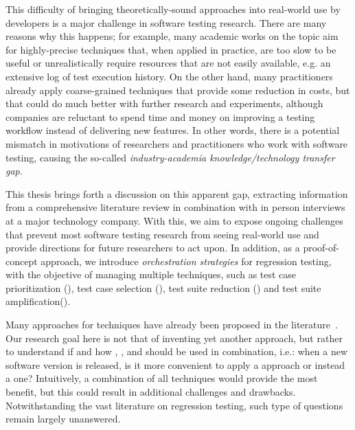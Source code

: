 This difficulty of bringing theoretically-sound approaches into real-world use by developers is a major challenge in software testing research.
There are many reasons why this happens; for example, many academic works on the topic aim for highly-precise techniques that, when applied in practice, are too slow to be useful or unrealistically require resources that are not easily available, e.g. an extensive log of test execution history.
On the other hand, many practitioners already apply coarse-grained techniques that provide some reduction in costs, but that could do much better with further research and experiments, although companies are reluctant to spend time and money on improving a testing workflow instead of delivering new features.
In other words, there is a potential mismatch in motivations of researchers and practitioners who work with software testing, causing the so-called \textit{industry-academia knowledge/technology transfer gap}.


This thesis brings forth a discussion on this apparent gap, extracting information from a comprehensive literature review in combination with in person interviews at a major technology company.
With this, we aim to expose ongoing challenges that prevent most software testing research from seeing real-world use and provide directions for future researchers to act upon.
In addition, as a proof-of-concept approach, we introduce \textit{orchestration strategies} for regression testing, with the objective of managing multiple \rt techniques, such as test case prioritization (\tcp), test case selection (\tcs), test suite reduction (\tsr) and test suite amplification(\tsa).

Many approaches for \rt techniques have already been proposed in the literature~\cite{soetens2016change,legunsen2016,henard2016,luo2018static}.
Our research goal here is not that of inventing yet another approach, but rather to understand if and how \tcs, \tcp, \tsr and \tsa should be used in combination, i.e.:
when a new software version is released, is it more convenient to apply a \tcs approach or instead a \tcp one?
Intuitively, a combination of all techniques would provide the most benefit, but this could result in additional challenges and drawbacks.
Notwithstanding the vast literature on regression testing, such type of questions remain largely unanswered.

